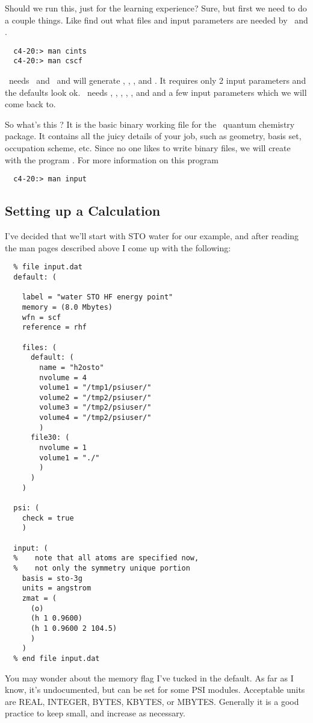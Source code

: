 Should we run this, just for the learning experience? Sure,
but first we need to do a couple things. Like find out what
files and input parameters are needed by \PSIcints\ and \PSIcscf. 
\begin{verbatim}
  c4-20:> man cints
  c4-20:> man cscf
\end{verbatim}
\PSIcints\ needs \ and \ and will generate ,
, , and . It requires only 2 input parameters
and the defaults look ok. \PSIcscf\ needs , , ,
, , and  and
a few input parameters which we will come back to. 

So what's this ? It is the basic binary working file for the \PSIthree\
quantum chemistry package. It contains all the juicy details of your job,
such as geometry, basis set, occupation scheme, etc.
Since no one likes to write binary files,
we will create  with the program \PSIinput.
For more information on this program 
\begin{verbatim}
  c4-20:> man input
\end{verbatim}


\subsection{Setting up a Calculation}
I've decided that we'll start with STO water for our example, and
after reading the man pages described above I come up with the following: 
\begin{verbatim}
  % file input.dat
  default: (

    label = "water STO HF energy point"
    memory = (8.0 Mbytes)
    wfn = scf
    reference = rhf

    files: (
      default: (
        name = "h2osto"
        nvolume = 4
        volume1 = "/tmp1/psiuser/"
        volume2 = "/tmp2/psiuser/"
        volume3 = "/tmp2/psiuser/"
        volume4 = "/tmp2/psiuser/"
        )
      file30: (
        nvolume = 1
        volume1 = "./"
        )
      )
    )

  psi: (
    check = true
    )

  input: (
  %    note that all atoms are specified now,
  %    not only the symmetry unique portion
    basis = sto-3g
    units = angstrom
    zmat = (
      (o)
      (h 1 0.9600)
      (h 1 0.9600 2 104.5)
      )
    )
  % end file input.dat
\end{verbatim}
You may wonder about the memory flag I've tucked in the default. As far
as I know, it's undocumented, but can be set for some PSI modules.
Acceptable units are REAL, INTEGER, BYTES,
KBYTES, or MBYTES. Generally it is a good practice to keep
 small, and 
increase  as necessary. 

